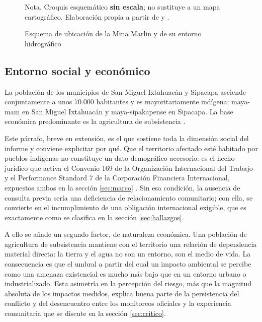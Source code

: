 \begin{figure}[H]
  \caption{Esquema de ubicación de la Mina Marlin y de su entorno hidrográfico}
  \label{fig:mapa-ubicacion}
  \par\vspace{2pt}
  \raggedright\footnotesize
  Nota. Croquis esquemático \textbf{sin escala}; no sustituye a un mapa
  cartográfico. Elaboración propia a partir de \textcite{sec2011ni43101} y
  \textcite{oncommonground2010hria}.
\end{figure}

\subsection{Entorno social y económico}

La población de los municipios de San Miguel Ixtahuacán y Sipacapa asciende
conjuntamente a unos 70.000 habitantes y es mayoritariamente indígena: maya-mam
en San Miguel Ixtahuacán y maya-sipakapense en Sipacapa. La base económica
predominante es la agricultura de subsistencia
\parencite{oncommonground2010hria, ocmalsfmarlin}.

Este párrafo, breve en extensión, es el que sostiene toda la dimensión social del
informe y conviene explicitar por qué. Que el territorio afectado esté habitado
por pueblos indígenas no constituye un dato demográfico accesorio: es el hecho
jurídico que activa el Convenio 169 de la Organización Internacional del Trabajo
y el Performance Standard 7 de la Corporación Financiera Internacional, expuestos
ambos en la sección \ref{sec:marco} \parencite{oit1989convenio169}. Sin esa
condición, la ausencia de consulta previa sería una deficiencia de
relacionamiento comunitario; con ella, se convierte en el incumplimiento de una
obligación internacional exigible, que es exactamente como se clasifica en la
sección \ref{sec:hallazgos}.

A ello se añade un segundo factor, de naturaleza económica. Una población de
agricultura de subsistencia mantiene con el territorio una relación de dependencia
material directa: la tierra y el agua no son un entorno, son el medio de vida. La
consecuencia es que el umbral a partir del cual un impacto ambiental se percibe
como una amenaza existencial es mucho más bajo que en un entorno urbano o
industrializado. Esta asimetría en la percepción del riesgo, más que la magnitud
absoluta de los impactos medidos, explica buena parte de la persistencia del
conflicto y del desencuentro entre los monitoreos oficiales y la experiencia
comunitaria que se discute en la sección \ref{sec:critico}.

